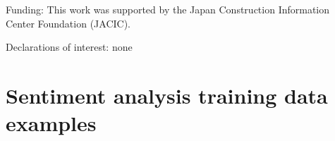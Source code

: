 \documentclass[review]{elsarticle}
\begin{document}
Funding: This work was supported by the Japan Construction Information Center Foundation (JACIC).

\medskip

Declarations of interest: none

\clearpage




\clearpage

\appendixpage
\appendix

\section{Sentiment analysis training data examples}
\end{document}
